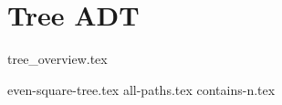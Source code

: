 \documentclass{exam}
\begin{document}
\newpage
\section{Tree ADT}
{tree_overview.tex}
\begin{questions}
    {even-square-tree.tex}
    {all-paths.tex}
    {contains-n.tex}
\end{questions}
\end{document}
